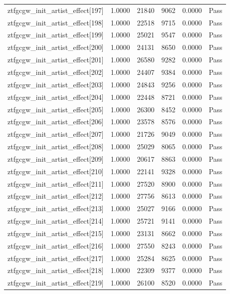 \begin{table}[htbp]
\begin{tabular}{llrrll}
ztfgcgw\_init\_artist\_effect[197] & 1.0000 & 21840 & 9062 & 0.0000 & Pass \\
ztfgcgw\_init\_artist\_effect[198] & 1.0000 & 22518 & 9715 & 0.0000 & Pass \\
ztfgcgw\_init\_artist\_effect[199] & 1.0000 & 25021 & 9547 & 0.0000 & Pass \\
ztfgcgw\_init\_artist\_effect[200] & 1.0000 & 24131 & 8650 & 0.0000 & Pass \\
ztfgcgw\_init\_artist\_effect[201] & 1.0000 & 26580 & 9282 & 0.0000 & Pass \\
ztfgcgw\_init\_artist\_effect[202] & 1.0000 & 24407 & 9384 & 0.0000 & Pass \\
ztfgcgw\_init\_artist\_effect[203] & 1.0000 & 24843 & 9256 & 0.0000 & Pass \\
ztfgcgw\_init\_artist\_effect[204] & 1.0000 & 22448 & 8721 & 0.0000 & Pass \\
ztfgcgw\_init\_artist\_effect[205] & 1.0000 & 26300 & 8452 & 0.0000 & Pass \\
ztfgcgw\_init\_artist\_effect[206] & 1.0000 & 23578 & 8576 & 0.0000 & Pass \\
ztfgcgw\_init\_artist\_effect[207] & 1.0000 & 21726 & 9049 & 0.0000 & Pass \\
ztfgcgw\_init\_artist\_effect[208] & 1.0000 & 25029 & 8065 & 0.0000 & Pass \\
ztfgcgw\_init\_artist\_effect[209] & 1.0000 & 20617 & 8863 & 0.0000 & Pass \\
ztfgcgw\_init\_artist\_effect[210] & 1.0000 & 22141 & 9328 & 0.0000 & Pass \\
ztfgcgw\_init\_artist\_effect[211] & 1.0000 & 27520 & 8900 & 0.0000 & Pass \\
ztfgcgw\_init\_artist\_effect[212] & 1.0000 & 27756 & 8613 & 0.0000 & Pass \\
ztfgcgw\_init\_artist\_effect[213] & 1.0000 & 25027 & 9166 & 0.0000 & Pass \\
ztfgcgw\_init\_artist\_effect[214] & 1.0000 & 25721 & 9141 & 0.0000 & Pass \\
ztfgcgw\_init\_artist\_effect[215] & 1.0000 & 23131 & 8662 & 0.0000 & Pass \\
ztfgcgw\_init\_artist\_effect[216] & 1.0000 & 27550 & 8243 & 0.0000 & Pass \\
ztfgcgw\_init\_artist\_effect[217] & 1.0000 & 25284 & 8625 & 0.0000 & Pass \\
ztfgcgw\_init\_artist\_effect[218] & 1.0000 & 22309 & 9377 & 0.0000 & Pass \\
ztfgcgw\_init\_artist\_effect[219] & 1.0000 & 26100 & 8520 & 0.0000 & Pass \\

\end{tabular}
\end{table}
